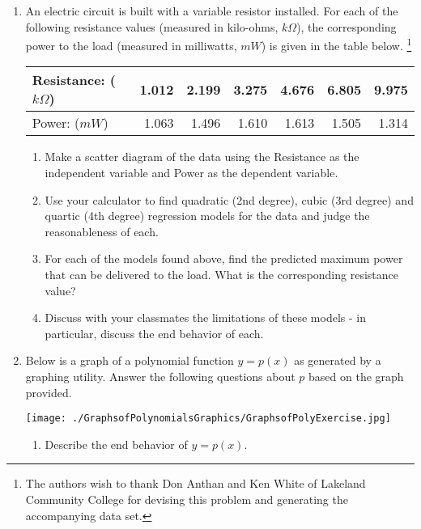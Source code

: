\documentclass{ximera}
\begin{document}
\begin{enumerate}
\item \label{circuitexercisepoly} An electric circuit is built with a variable resistor installed.  For each of the following resistance values (measured in kilo-ohms, $k \Omega$),  the corresponding power to the load (measured in milliwatts, $mW$) is given in the table below. \footnote{The authors wish to thank Don Anthan and Ken White of Lakeland Community College for devising this problem and generating the accompanying data set.}

\noindent \begin{tabular}{|l|r|r|r|r|r|r|} \hline
Resistance: ($k \Omega$) & 1.012 & 2.199 & 3.275 & 4.676 & 6.805 & 9.975 \\ \hline
Power: ($mW$) & 1.063 & 1.496 & 1.610 & 1.613 & 1.505 & 1.314 \\ \hline
\end{tabular}

\begin{enumerate}

\item Make a scatter diagram of the data using the Resistance as the independent variable and Power as the dependent variable.

\item Use your calculator to find quadratic (2nd degree), cubic (3rd degree) and quartic (4th degree) regression models for the data and judge the reasonableness of each.

\item For each of the models found above, find the predicted maximum power that can be delivered to the load.  What is the corresponding resistance value?

\item Discuss with your classmates the limitations of these models - in particular, discuss the end behavior of each.

\end{enumerate}

\newpage

\item Below is a graph of  a polynomial function $y = p(x)$ as generated by a graphing utility.   Answer the following questions about $p$ based on the graph provided.


\centerline{\texttt{[image: ./GraphsofPolynomialsGraphics/GraphsofPolyExercise.jpg]}}

\begin{enumerate}

\item  Describe the end behavior of $y = p(x)$.


\end{enumerate}
\end{enumerate}
\end{document}
